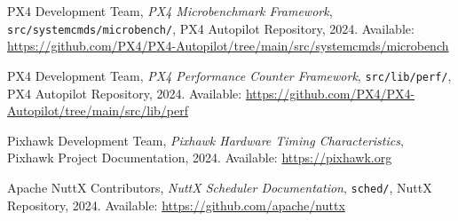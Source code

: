 \documentclass[11pt]{article}
\begin{document}
\begin{thebibliography}{20}
PX4 Development Team, \textit{PX4 Microbenchmark Framework}, \texttt{src/systemcmds/microbench/}, PX4 Autopilot Repository, 2024. Available: \url{https://github.com/PX4/PX4-Autopilot/tree/main/src/systemcmds/microbench}

PX4 Development Team, \textit{PX4 Performance Counter Framework}, \texttt{src/lib/perf/}, PX4 Autopilot Repository, 2024. Available: \url{https://github.com/PX4/PX4-Autopilot/tree/main/src/lib/perf}

Pixhawk Development Team, \textit{Pixhawk Hardware Timing Characteristics}, Pixhawk Project Documentation, 2024. Available: \url{https://pixhawk.org}

Apache NuttX Contributors, \textit{NuttX Scheduler Documentation}, \texttt{sched/}, NuttX Repository, 2024. Available: \url{https://github.com/apache/nuttx}

\end{thebibliography}
\end{document}
